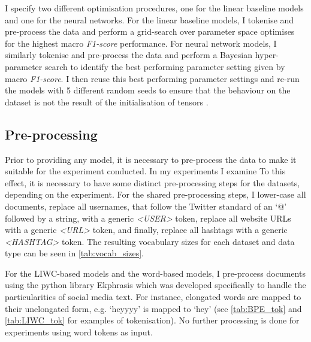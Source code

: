 I specify two different optimisation procedures, one for the linear baseline models and one for the neural networks.
For the linear baseline models, I tokenise and pre-process the data and perform a grid-search over  parameter space  optimises for the highest macro \textit{F1-score} performance.
For neural network models, I similarly tokenise and pre-process the data and perform a Bayesian hyper-parameter search to identify the best performing parameter setting given by macro \textit{F1-score}.
I then reuse this best performing parameter settings and re-run the models with 5 different random seeds to ensure that the  behaviour on the dataset is not the result of the  initialisation of  tensors .

\subsection{Pre-processing}
Prior to providing  any model, it is necessary to pre-process the data to make it suitable for the experiment conducted.
In my experiments I examine 
To this effect, it is necessary to have some  distinct pre-processing steps for the datasets, depending on the experiment.
For the shared pre-processing steps, I lower-case all documents, replace all usernames, that follow the Twitter standard of an `@' followed by a string, with a generic \textit{<USER>} token, replace all website URLs with a generic \textit{<URL>} token, and finally, replace all hashtags with a generic \textit{<HASHTAG>} token.
The resulting vocabulary sizes for each dataset and data type can be seen in \cref{tab:vocab_sizes}.

For the LIWC-based models and the word-based models, I pre-process documents using the python library Ekphrasis \citep{baziotis:2017} which was developed specifically to handle the particularities of social media text.
For instance, elongated words are mapped to their unelongated form, e.g. `heyyyy' is mapped to `hey' (see \cref{tab:BPE_tok} and \cref{tab:LIWC_tok} for examples of tokenisation).
No further processing is done for experiments using word tokens as input.

